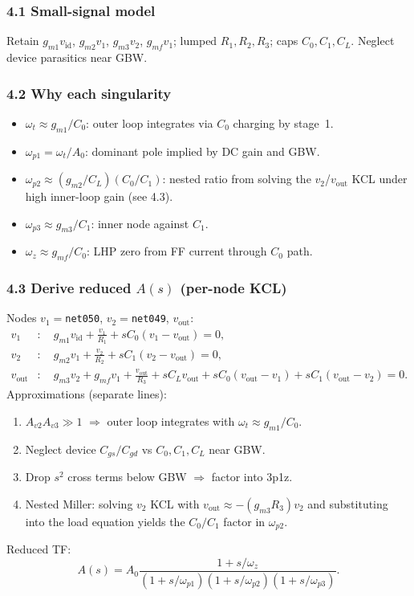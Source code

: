 \documentclass[11pt]{article}
\begin{document}
\subsubsection{4.1 Small-signal model}
Retain $g_{m1}v_{\mathrm{id}}$, $g_{m2}v_1$, $g_{m3}v_2$, $g_{mf}v_1$;
lumped $R_1,R_2,R_3$; caps $C_0,C_1,C_L$. Neglect device parasitics near GBW.

\subsubsection{4.2 Why each singularity}
\begin{itemize}
  \item $\omega_t{\approx}g_{m1}/C_0$: outer loop integrates via $C_0$ charging by stage~1.
  \item $\omega_{p1}{=}\omega_t/A_0$: dominant pole implied by DC gain and GBW.
  \item $\omega_{p2}{\approx}(g_{m2}/C_L)(C_0/C_1)$: nested ratio from solving the
        $v_2$/$v_{\mathrm{out}}$ KCL under high inner-loop gain (see 4.3).
  \item $\omega_{p3}{\approx}g_{m3}/C_1$: inner node against $C_1$.
  \item $\omega_z{\approx}g_{mf}/C_0$: LHP zero from FF current through $C_0$ path.
\end{itemize}

\subsubsection{4.3 Derive reduced $A(s)$ (per-node KCL)}
Nodes $v_1{=}$\texttt{net050}, $v_2{=}$\texttt{net049}, $v_{\mathrm{out}}$:
\begin{align*}
v_1&: \quad
  g_{m1} v_{\mathrm{id}} + \frac{v_1}{R_1}
  + s C_0 (v_1 - v_{\mathrm{out}}) = 0,\\
v_2&: \quad
  g_{m2} v_1 + \frac{v_2}{R_2}
  + s C_1 (v_2 - v_{\mathrm{out}}) = 0,\\
v_{\mathrm{out}}&: \quad
  g_{m3} v_2 + g_{mf} v_1 + \frac{v_{\mathrm{out}}}{R_3}
  + s C_L v_{\mathrm{out}}
  + s C_0 (v_{\mathrm{out}}-v_1)
  + s C_1 (v_{\mathrm{out}}-v_2) = 0.
\end{align*}
Approximations (separate lines):
\begin{enumerate}
  \item $A_{v2}A_{v3}\gg 1$ $\Rightarrow$ outer loop integrates with $\omega_t\approx g_{m1}/C_0$.
  \item Neglect device $C_{gs}/C_{gd}$ vs $C_0,C_1,C_L$ near GBW.
  \item Drop $s^2$ cross terms below GBW $\Rightarrow$ factor into 3p1z.
  \item Nested Miller: solving $v_2$ KCL with $v_{\mathrm{out}}\approx - (g_{m3}R_3)v_2$
        and substituting into the load equation yields the $C_0/C_1$ factor in $\omega_{p2}$.
\end{enumerate}
Reduced TF:
\[
A(s)=A_0\frac{1+s/\omega_z}{(1+s/\omega_{p1})(1+s/\omega_{p2})(1+s/\omega_{p3})}.
\]
\end{document}
